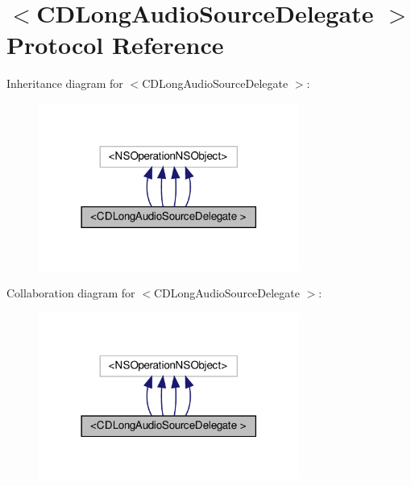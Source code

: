 \hypertarget{protocolCDLongAudioSourceDelegate_01-p}{}\section{$<$C\+D\+Long\+Audio\+Source\+Delegate $>$ Protocol Reference}
\label{protocolCDLongAudioSourceDelegate_01-p}


Inheritance diagram for $<$C\+D\+Long\+Audio\+Source\+Delegate $>$\+:
\nopagebreak
\begin{figure}[H]
\begin{center}
\leavevmode
\includegraphics[width=242pt]{protocolCDLongAudioSourceDelegate_01-p__inherit__graph}
\end{center}
\end{figure}


Collaboration diagram for $<$C\+D\+Long\+Audio\+Source\+Delegate $>$\+:
\nopagebreak
\begin{figure}[H]
\begin{center}
\leavevmode
\includegraphics[width=242pt]{protocolCDLongAudioSourceDelegate_01-p__coll__graph}
\end{center}
\end{figure}
